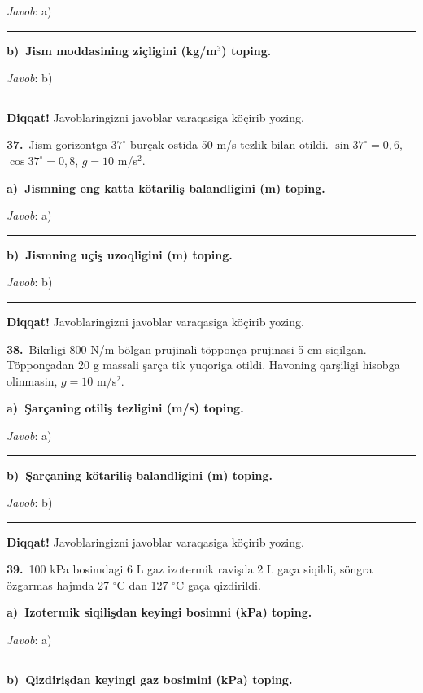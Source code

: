 \documentclass[11pt,a4paper]{article}
\newcommand{\blank}{\rule{5cm}{0.4pt}}
\begin{document}
\noindent\textit{Javob}: a)\ \blank\par
\medskip\noindent\textbf{b)\ Jism moddasining ziçligini (kg/m$^3$) toping.}\par
\noindent\textit{Javob}: b)\ \blank\par
\medskip\noindent\textbf{Diqqat!} Javoblaringizni javoblar varaqasiga köçirib yozing.\par\vspace{10pt}
\noindent\textbf{37.}\ Jism gorizontga $37^\circ$ burçak ostida 50 m/s tezlik bilan otildi. $\sin37^\circ=0{,}6$, $\cos37^\circ=0{,}8$, $g=10$ m/s$^2$.\par\smallskip
\medskip\noindent\textbf{a)\ Jismning eng katta kötariliş balandligini (m) toping.}\par
\noindent\textit{Javob}: a)\ \blank\par
\medskip\noindent\textbf{b)\ Jismning uçiş uzoqligini (m) toping.}\par
\noindent\textit{Javob}: b)\ \blank\par
\medskip\noindent\textbf{Diqqat!} Javoblaringizni javoblar varaqasiga köçirib yozing.\par\vspace{10pt}
\noindent\textbf{38.}\ Bikrligi 800 N/m bölgan prujinali töpponça prujinasi 5 cm siqilgan. Töpponçadan 20 g massali şarça tik yuqoriga otildi. Havoning qarşiligi hisobga olinmasin, $g=10$ m/s$^2$.\par\smallskip
\medskip\noindent\textbf{a)\ Şarçaning otiliş tezligini (m/s) toping.}\par
\noindent\textit{Javob}: a)\ \blank\par
\medskip\noindent\textbf{b)\ Şarçaning kötariliş balandligini (m) toping.}\par
\noindent\textit{Javob}: b)\ \blank\par
\medskip\noindent\textbf{Diqqat!} Javoblaringizni javoblar varaqasiga köçirib yozing.\par\vspace{10pt}
\noindent\textbf{39.}\ 100 kPa bosimdagi 6 L gaz izotermik ravişda 2 L gaça siqildi, söngra özgarmas hajmda 27 $^\circ$C dan 127 $^\circ$C gaça qizdirildi.\par\smallskip
\medskip\noindent\textbf{a)\ Izotermik siqilişdan keyingi bosimni (kPa) toping.}\par
\noindent\textit{Javob}: a)\ \blank\par
\medskip\noindent\textbf{b)\ Qizdirişdan keyingi gaz bosimini (kPa) toping.}\par
\end{document}
